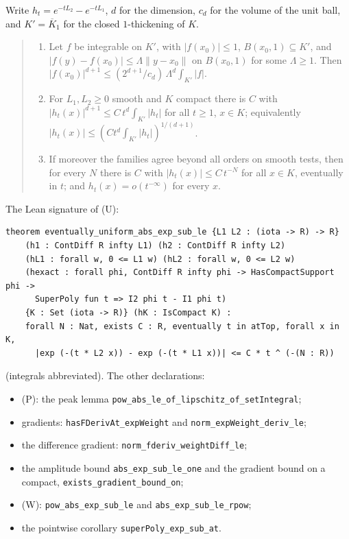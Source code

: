 \documentclass[11pt]{article}
\newcommand{\code}[1]{\texttt{#1}}
\begin{document}
Write $h_t = e^{-tL_2} - e^{-tL_1}$, $d$ for the dimension, $c_d$ for the
volume of the unit ball, and $K' = \overline{K}_1$ for the closed
$1$-thickening of $K$.

\begin{quote}\itshape
\begin{enumerate}
\item[(P)] Let $f$ be integrable on $K'$, with $|f(x_0)| \le 1$, $B(x_0,1)
\subseteq K'$, and $|f(y) - f(x_0)| \le \Lambda\|y - x_0\|$ on $B(x_0,1)$
for some $\Lambda \ge 1$. Then $|f(x_0)|^{d+1} \le (2^{d+1}/c_d)\,
\Lambda^d \int_{K'}|f|$.
\item[(W)] For $L_1, L_2 \ge 0$ smooth and $K$ compact there is $C$ with
$|h_t(x)|^{d+1} \le C\,t^{d}\int_{K'}|h_t|$ for all $t \ge 1$, $x \in K$;
equivalently $|h_t(x)| \le (C t^d \int_{K'}|h_t|)^{1/(d+1)}$.
\item[(U)] If moreover the families agree beyond all orders on smooth
tests, then for every $N$ there is $C$ with $|h_t(x)| \le C\,t^{-N}$
for all $x \in K$, eventually in $t$; and $h_t(x) = o(t^{-\infty})$ for
every $x$.
\end{enumerate}
\end{quote}

\noindent The Lean signature of (U):
\begin{verbatim}
theorem eventually_uniform_abs_exp_sub_le {L1 L2 : (iota -> R) -> R}
    (h1 : ContDiff R infty L1) (h2 : ContDiff R infty L2)
    (hL1 : forall w, 0 <= L1 w) (hL2 : forall w, 0 <= L2 w)
    (hexact : forall phi, ContDiff R infty phi -> HasCompactSupport phi ->
      SuperPoly fun t => I2 phi t - I1 phi t)
    {K : Set (iota -> R)} (hK : IsCompact K) :
    forall N : Nat, exists C : R, eventually t in atTop, forall x in K,
      |exp (-(t * L2 x)) - exp (-(t * L1 x))| <= C * t ^ (-(N : R))
\end{verbatim}
(integrals abbreviated). The other declarations:
\begin{itemize}
\item (P): the peak lemma \code{pow\_abs\_le\_of\_lipschitz\_of\_setIntegral};
\item gradients: \code{hasFDerivAt\_expWeight} and
\code{norm\_expWeight\_deriv\_le};
\item the difference gradient: \code{norm\_fderiv\_weightDiff\_le};
\item the amplitude bound \code{abs\_exp\_sub\_le\_one} and the gradient
bound on a compact, \code{exists\_gradient\_bound\_on};
\item (W): \code{pow\_abs\_exp\_sub\_le} and \code{abs\_exp\_sub\_le\_rpow};
\item the pointwise corollary \code{superPoly\_exp\_sub\_at}.
\end{itemize}
\end{document}
